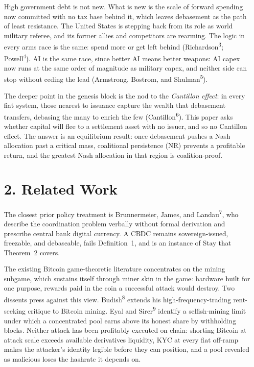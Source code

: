 \documentclass[12pt]{article}
\theoremstyle{definition}
\theoremstyle{remark}
\begin{document}
High government debt is not new. What is new is the scale of forward spending now committed with no tax base behind it, which leaves debasement as the path of least resistance. The United States is stepping back from its role as world military referee, and its former allies and competitors are rearming. The logic in every arms race is the same: spend more or get left behind (Richardson\textsuperscript{3}; Powell\textsuperscript{4}). AI is the same race, since better AI means better weapons: AI capex now runs at the same order of magnitude as military capex, and neither side can stop without ceding the lead (Armstrong, Bostrom, and Shulman\textsuperscript{5}).

The deeper point in the genesis block is the nod to the \emph{Cantillon effect}: in every fiat system, those nearest to issuance capture the wealth that debasement transfers, debasing the many to enrich the few (Cantillon\textsuperscript{6}). This paper asks whether capital will flee to a settlement asset with no issuer, and so no Cantillon effect. The answer is an equilibrium result: once debasement pushes a Nash allocation past a critical mass, coalitional persistence (NR) prevents a profitable return, and the greatest Nash allocation in that region is coalition-proof.

\newpage


\section{2. Related Work}

The closest prior policy treatment is
Brunnermeier, James, and Landau\textsuperscript{7}, who describe the
coordination problem verbally without formal derivation and prescribe
central bank digital currency. A CBDC remains sovereign-issued,
freezable, and debaseable, fails Definition~1, and is an instance of
Stay that Theorem~2 covers.

The existing Bitcoin game-theoretic literature concentrates on the mining subgame, which sustains itself through miner skin in the game: hardware built for one purpose, rewards paid in the coin a successful attack would destroy. Two dissents press against this view. Budish\textsuperscript{8} extends his high-frequency-trading rent-seeking critique to Bitcoin mining. Eyal and Sirer\textsuperscript{9} identify a selfish-mining limit under which a concentrated pool earns above its honest share by withholding blocks. Neither attack has been profitably executed on chain: shorting Bitcoin at attack scale exceeds available derivatives liquidity, KYC at every fiat off-ramp makes the attacker's identity legible before they can position, and a pool revealed as malicious loses the hashrate it depends on.
\end{document}
